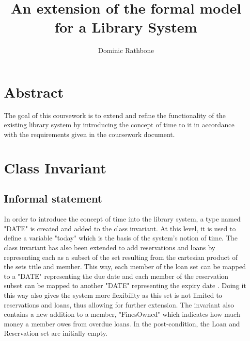 \documentclass[]{report}
\title{An extension of the formal model for a Library System}
\author{Dominic Rathbone}
\begin{document}
\maketitle

\section{Abstract}
The goal of this coursework is to extend and refine the functionality of the existing library system by introducing the concept of time to it in accordance with the requirements given in the coursework document.

\section{Class Invariant}
\subsection{Informal statement}
In order to introduce the concept of time into the library system, a type named "DATE" is created and added to the class invariant. At this level, it is used to define a variable "today" which is the basis of the system's notion of time. The class invariant has also been extended to add reservations and loans by representing each as a subset of the set resulting from the cartesian product of the sets title and member. This way, each member of the loan set can be mapped to a "DATE" representing the due date and each member of the reservation subset can be mapped to another "DATE" representing the expiry date . Doing it this way also gives the system more flexibility as this set is not limited to reservations and loans, thus allowing for further extension. The invariant also contains a new addition to a member, "FinesOwned" which indicates how much money a member owes from overdue loans. In the post-condition, the Loan and Reservation set are initially empty.
\end{document}
